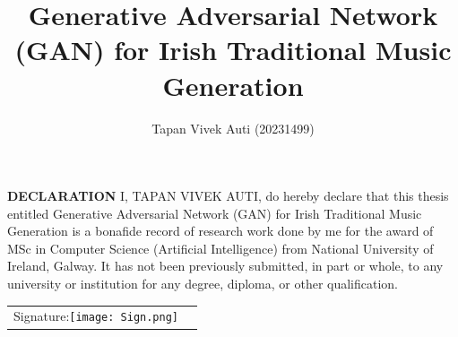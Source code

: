 \documentclass[oneside,12pt]{Classes/RoboticsLaTeX}
\title{\Large{Generative Adversarial Network (GAN) for Irish Traditional Music Generation}}
\author{Tapan Vivek Auti (20231499)}
\begin{document}
\begin{spacing}{1}
\maketitle
\end{spacing}
\titleformat{\chapter}[display]
  {\normalfont\huge\bfseries}{\vskip-2.5em\chaptertitlename\ \thechapter}{20pt}{\Large}



\newpage\null\thispagestyle{empty}\newpage

\setcounter{secnumdepth}{3}
\setcounter{tocdepth}{3}

\frontmatter
\textbf{DECLARATION} 
I, TAPAN VIVEK AUTI, do hereby declare that this thesis entitled Generative Adversarial Network (GAN) for Irish Traditional Music Generation is a bonafide record of research work done by me for the award of MSc in Computer Science (Artificial Intelligence) from National University of Ireland, Galway. It has not been previously submitted, in part or whole, to any university or institution for any degree, diploma, or other qualification. 
\newline

\begin{tabular}{@{}p{.5in}p{4in}@{}}
Signature:\texttt{[image: Sign.png]} 
\end{tabular}
\newpage


%
%


\end{document}
